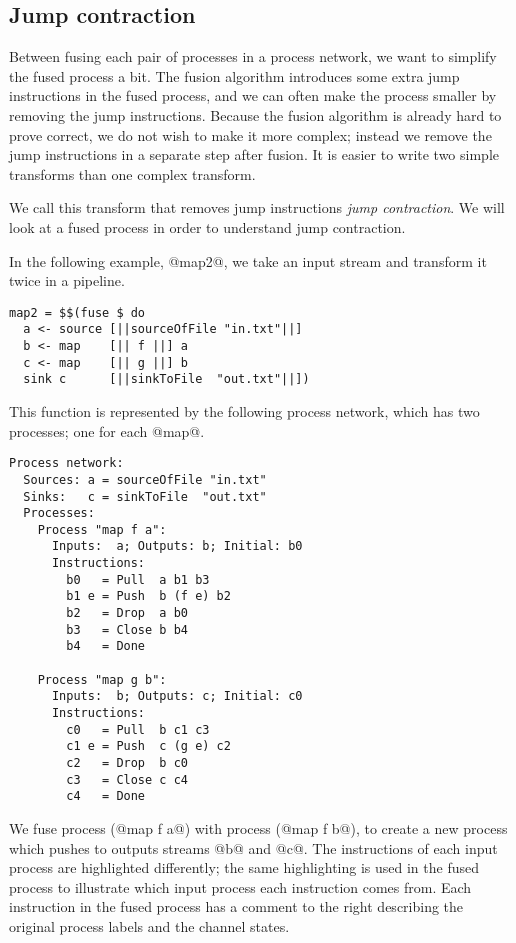 \subsection{Jump contraction}
\label{section:implementation:jump-contraction}
Between fusing each pair of processes in a process network, we want to simplify the fused process a bit.
The fusion algorithm introduces some extra jump instructions in the fused process, and we can often make the process smaller by removing the jump instructions.
Because the fusion algorithm is already hard to prove correct, we do not wish to make it more complex; instead we remove the jump instructions in a separate step after fusion.
It is easier to write two simple transforms than one complex transform.

We call this transform that removes jump instructions \emph{jump contraction}.
We will look at a fused process in order to understand jump contraction.

In the following example, @map2@, we take an input stream and transform it twice in a pipeline.

\begin{lstlisting}
map2 = $$(fuse $ do
  a <- source [||sourceOfFile "in.txt"||]
  b <- map    [|| f ||] a
  c <- map    [|| g ||] b
  sink c      [||sinkToFile  "out.txt"||])
\end{lstlisting}

This function is represented by the following process network, which has two processes; one for each @map@.

\begin{lstlisting}[linebackgroundcolor={
  \hilineFst{8}
  \hilineFst{9}
  \hilineFst{10}
  \hilineFst{11}
  \hilineFst{12}
  \hilineSnd{17}
  \hilineSnd{18}
  \hilineSnd{19}
  \hilineSnd{20}
  \hilineSnd{21}
  }]
Process network:
  Sources: a = sourceOfFile "in.txt"
  Sinks:   c = sinkToFile  "out.txt"
  Processes:
    Process "map f a":
      Inputs:  a; Outputs: b; Initial: b0
      Instructions:
        b0   = Pull  a b1 b3
        b1 e = Push  b (f e) b2
        b2   = Drop  a b0
        b3   = Close b b4        
        b4   = Done

    Process "map g b":
      Inputs:  b; Outputs: c; Initial: c0
      Instructions:
        c0   = Pull  b c1 c3      
        c1 e = Push  c (g e) c2     
        c2   = Drop  b c0
        c3   = Close c c4         
        c4   = Done
\end{lstlisting}

We fuse process (@map f a@) with process (@map f b@), to create a new process which pushes to outputs streams @b@ and @c@.
The instructions of each input process are highlighted differently; the same highlighting is used in the fused process to illustrate which input process each instruction comes from.
Each instruction in the fused process has a comment to the right describing the original process labels and the channel states.


